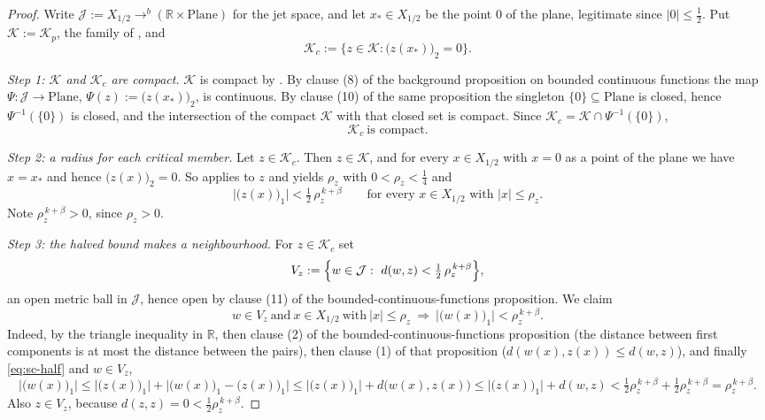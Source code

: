 \begin{proof}
Write $\mathcal{J}:=X_{1/2}\to^{b}(\mathbb{R}\times\mathrm{Plane})$ for the jet space, and let
$x_\ast\in X_{1/2}$ be the point $0$ of the plane, legitimate since $\lvert0\rvert\le\tfrac12$.
Put $\mathcal{K}:=\mathcal{K}_p$, the family of , and
\[
  \mathcal{K}_c:=\bigl\{z\in\mathcal{K}:\bigl(z(x_\ast)\bigr)_2=0\bigr\} .
\]

\medskip\noindent\emph{Step 1: $\mathcal{K}$ and $\mathcal{K}_c$ are compact.}
$\mathcal{K}$ is compact by .  By clause (8) of the background
proposition on bounded continuous functions the map $\Psi\colon\mathcal{J}\to\mathrm{Plane}$,
$\Psi(z):=\bigl(z(x_\ast)\bigr)_2$, is continuous.  By clause (10) of the same proposition the
singleton $\{0\}\subseteq\mathrm{Plane}$ is closed, hence $\Psi^{-1}(\{0\})$ is closed, and the
intersection of the compact $\mathcal{K}$ with that closed set is compact.  Since
$\mathcal{K}_c=\mathcal{K}\cap\Psi^{-1}(\{0\})$,
\begin{equation}\label{eq:sc-Kc}
  \mathcal{K}_c\ \text{is compact.}
\end{equation}

\medskip\noindent\emph{Step 2: a radius for each critical member.}
Let $z\in\mathcal{K}_c$.  Then $z\in\mathcal{K}$, and for every $x\in X_{1/2}$ with $x=0$ as a
point of the plane we have $x=x_\ast$ and hence $\bigl(z(x)\bigr)_2=0$.  So
 applies to $z$ and yields $\rho_z$ with $0<\rho_z<\tfrac14$ and
\begin{equation}\label{eq:sc-half}
  \bigl\lvert\bigl(z(x)\bigr)_1\bigr\rvert<\tfrac12\,\rho_z^{\,k+\beta}
  \qquad\text{for every }x\in X_{1/2}\text{ with }\lvert x\rvert\le\rho_z .
\end{equation}
Note $\rho_z^{\,k+\beta}>0$, since $\rho_z>0$.

\medskip\noindent\emph{Step 3: the halved bound makes a neighbourhood.}
For $z\in\mathcal{K}_c$ set
\[
  V_z:=\Bigl\{w\in\mathcal{J}:\ d(w,z)<\tfrac12\,\rho_z^{\,k+\beta}\Bigr\} ,
\]
an open metric ball in $\mathcal{J}$, hence open by clause (11) of the
bounded-continuous-functions proposition.  We claim
\begin{equation}\label{eq:sc-nbhd}
  w\in V_z\ \text{and}\ x\in X_{1/2}\ \text{with}\ \lvert x\rvert\le\rho_z
  \ \Longrightarrow\ \bigl\lvert\bigl(w(x)\bigr)_1\bigr\rvert<\rho_z^{\,k+\beta} .
\end{equation}
Indeed, by the triangle inequality in $\mathbb{R}$, then clause (2) of the
bounded-continuous-functions proposition (the distance between first components is at most the
distance between the pairs), then clause (1) of that proposition
($d(w(x),z(x))\le d(w,z)$), and finally \eqref{eq:sc-half} and $w\in V_z$,
\[
  \bigl\lvert\bigl(w(x)\bigr)_1\bigr\rvert
  \le\bigl\lvert\bigl(z(x)\bigr)_1\bigr\rvert
     +\bigl\lvert\bigl(w(x)\bigr)_1-\bigl(z(x)\bigr)_1\bigr\rvert
  \le\bigl\lvert\bigl(z(x)\bigr)_1\bigr\rvert+d\bigl(w(x),z(x)\bigr)
  \le\bigl\lvert\bigl(z(x)\bigr)_1\bigr\rvert+d(w,z)
  <\tfrac12\rho_z^{\,k+\beta}+\tfrac12\rho_z^{\,k+\beta}
  =\rho_z^{\,k+\beta}.
\]
Also $z\in V_z$, because $d(z,z)=0<\tfrac12\rho_z^{\,k+\beta}$.


\end{proof}
